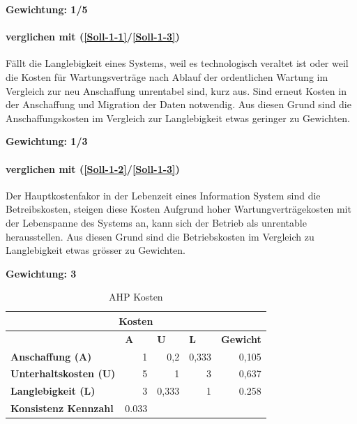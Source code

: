 \textbf{Gewichtung: 1/5}

\paragraph*{ verglichen mit  (\ref{Soll-1-1}/\ref{Soll-1-3})}
Fällt die Langlebigkeit eines Systems, weil es technologisch veraltet ist oder weil die Kosten für Wartungsverträge nach Ablauf der ordentlichen Wartung im Vergleich zur neu Anschaffung unrentabel sind, kurz aus. Sind erneut Kosten in der Anschaffung und Migration der Daten notwendig. Aus diesen Grund sind die Anschaffungskosten im Vergleich zur Langlebigkeit etwas geringer zu Gewichten.

\textbf{Gewichtung: 1/3}


\paragraph*{ verglichen mit  (\ref{Soll-1-2}/\ref{Soll-1-3})}
Der Hauptkostenfakor in der Lebenzeit eines Information System sind die Betreibskosten, steigen diese Kosten Aufgrund hoher Wartungverträgekosten mit der Lebenspanne des Systems an, kann sich der Betrieb als unrentable herausstellen. Aus diesen Grund sind die Betriebskosten im Vergleich zu Langlebigkeit etwas grösser zu Gewichten.

\textbf{Gewichtung: 3}

\begin{table}[htbp]
\caption{AHP Kosten}
\begin{tabular}{|l|r|l|l|l|}
\hline
\multicolumn{ 5}{|c|}{\textbf{Kosten}} \\ \hline
 & \multicolumn{1}{l|}{\textbf{A}} & \textbf{U} & \textbf{L} & \textbf{Gewicht} \\ \hline
\textbf{Anschaffung (A)} & 1 & \multicolumn{1}{r|}{0,2} & \multicolumn{1}{r|}{0,333} & \multicolumn{1}{r|}{0,105} \\ \hline
\textbf{Unterhaltskosten (U)} & 5 & \multicolumn{1}{r|}{1} & \multicolumn{1}{r|}{3} & \multicolumn{1}{r|}{0,637} \\ \hline
\textbf{Langlebigkeit (L)} & 3 & \multicolumn{1}{r|}{0,333} & \multicolumn{1}{r|}{1} & \multicolumn{1}{r|}{0.258} \\ \hline
\textbf{Konsistenz Kennzahl} & 0.033  \\ \cline{1-2}
\end{tabular}
\label{tab:AHPKosten}
\end{table}

